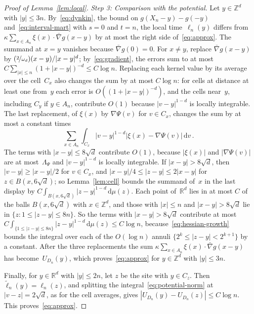 \documentclass[11pt]{amsart}
\theoremstyle{plain}
\theoremstyle{definition}
\newcommand{\Z}{\mathbb Z}
\newcommand{\R}{\mathbb R}
\newcommand{\drift}{\kappa}
\newcommand{\gauge}{\Psi}
\newcommand{\dd}{\,\mathrm d}
\newcommand{\nf}{\nicefrac}
\numberwithin{equation}{section}
\begin{document}
\begin{proof}[Proof of Lemma~\ref{lem:local}]
\emph{Step 3: Comparison with the potential.} Let $y\in\Z^d$ with $|y|\leq3n$. By~\eqref{eq:dynkin}, the bound on $g(X_n-y)-g(-y)$ and~\eqref{eq:interval-mart} with $s=0$ and $t=n$, the local time~$\ell_n(y)$ differs from $\drift\sum_{x\in A_n}\xi(x)\cdot\bar\nabla g(x-y)$ by at most the right side of~\eqref{eq:approx}. The summand at $x=y$ vanishes because $\bar\nabla g(0)=0$. For $x\neq y$, replace $\bar\nabla g(x-y)$ by $(\nf{2}{\omega_d})(x-y)/|x-y|^d$; by~\eqref{eq:gradient}, the errors sum to at most $C\sum_{|x|\leq n}(1+|x-y|)^{-d}\leq C\log n$. Replacing each kernel value by its average over the cell~$C_x$ also changes the sum by at most $C\log n$: for cells at distance at least one from~$y$ each error is $O((1+|x-y|)^{-d})$, and the cells near~$y$, including $C_y$ if $y\in A_n$, contribute $O(1)$ because $|v-y|^{1-d}$ is locally integrable. The last replacement, of $\xi(x)$ by $\nabla \gauge(v)$ for $v\in C_x$, changes the sum by at most a constant times
\begin{equation*}
\sum_{x\in A_n}\int_{C_x}|v-y|^{1-d}|\xi(x)-\nabla \gauge(v)|\dd v\, .
\end{equation*}
The terms with $|x-y|\leq8\sqrt d$ contribute $O(1)$, because $|\xi(x)|$ and $|\nabla \gauge(v)|$ are at most~$\Lambda_\gauge$ and $|v-y|^{1-d}$ is locally integrable. If $|x-y|>8\sqrt d$, then $|v-y|\geq|x-y|/2$ for $v\in C_x$, and $|x-y|/4\leq|z-y|\leq2|x-y|$ for $z\in B(x,6\sqrt d)$; so Lemma~\ref{lem:cell} bounds the summand of~$x$ in the last display by $C\int_{B(x,6\sqrt d)}|z-y|^{1-d}\dd\mu(z)$. Each point of~$\R^d$ lies in at most $C$ of the balls $B(x,6\sqrt d)$ with $x\in\Z^d$, and those with $|x|\leq n$ and $|x-y|>8\sqrt d$ lie in $\{z:1\leq|z-y|\leq8n\}$. So the terms with $|x-y|>8\sqrt d$ contribute at most $C\int_{\{1\leq|z-y|\leq8n\}}|z-y|^{1-d}\dd\mu(z)\leq C\log n$, because~\eqref{eq:hessian-growth} bounds the integral over each of the $O(\log n)$ annuli $\{2^k\leq|z-y|<2^{k+1}\}$ by a constant. After the three replacements the sum $\drift\sum_{x\in A_n}\xi(x)\cdot\bar\nabla g(x-y)$ has become~$U_{D_n}(y)$, which proves~\eqref{eq:approx} for $y\in\Z^d$ with $|y|\leq3n$.

Finally, for $y\in\R^d$ with $|y|\leq2n$, let $z$ be the site with $y\in C_z$. Then $\widetilde\ell_n(y)=\ell_n(z)$, and splitting the integral~\eqref{eq:potential-norm} at $|v-z|=2\sqrt d$, as for the cell averages, gives $|U_{D_n}(y)-U_{D_n}(z)|\leq C\log n$. This proves~\eqref{eq:approx}.
\end{proof}
\end{document}
